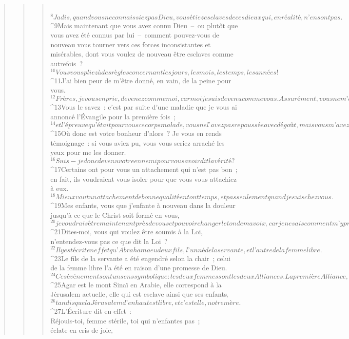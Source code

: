 \begin{verse}
\begin{verse}
\begin{verse}
         
${}^{8}Jadis, quand vous ne connaissiez pas Dieu, vous étiez esclaves de ces dieux qui, en réalité, n’en sont pas. 
${}^{9}Mais maintenant que vous avez connu Dieu – ou plutôt que vous avez été connus par lui – comment pouvez-vous de nouveau vous tourner vers ces forces inconsistantes et misérables, dont vous voulez de nouveau être esclaves comme autrefois ? 
${}^{10}Vous vous pliez à des règles concernant les jours, les mois, les temps, les années ! 
${}^{11}J’ai bien peur de m’être donné, en vain, de la peine pour vous.
${}^{12}Frères, je vous en prie, devenez comme moi, car moi je suis devenu comme vous. Assurément, vous ne m’avez fait aucun tort. 
${}^{13}Vous le savez : c’est par suite d’une maladie que je vous ai annoncé l’Évangile pour la première fois ; 
${}^{14}et l’épreuve qu’était pour vous ce corps malade, vous ne l’avez pas repoussée avec dégoût, mais vous m’avez accueilli comme un ange de Dieu, comme le Christ Jésus lui-même. 
${}^{15}Où donc est votre bonheur d’alors ? Je vous en rends témoignage : si vous aviez pu, vous vous seriez arraché les yeux pour me les donner. 
${}^{16}Suis-je donc devenu votre ennemi pour vous avoir dit la vérité ? 
${}^{17}Certains ont pour vous un attachement qui n’est pas bon ; en fait, ils voudraient vous isoler pour que vous vous attachiez à eux. 
${}^{18}Mieux vaut un attachement de bonne qualité en tout temps, et pas seulement quand je suis chez vous. 
${}^{19}Mes enfants, vous que j’enfante à nouveau dans la douleur jusqu’à ce que le Christ soit formé en vous, 
${}^{20}je voudrais être maintenant près de vous et pouvoir changer le ton de ma voix, car je ne sais comment m’y prendre avec vous.
${}^{21}Dites-moi, vous qui voulez être soumis à la Loi, n’entendez-vous pas ce que dit la Loi ? 
${}^{22}Il y est écrit en effet qu’Abraham a eu deux fils, l’un né de la servante, et l’autre de la femme libre. 
${}^{23}Le fils de la servante a été engendré selon la chair ; celui de la femme libre l’a été en raison d’une promesse de Dieu. 
${}^{24}Ces événements ont un sens symbolique : les deux femmes sont les deux Alliances. La première Alliance, celle du mont Sinaï, qui met au monde des enfants esclaves, c’est Agar, la servante. 
${}^{25}Agar est le mont Sinaï en Arabie, elle correspond à la Jérusalem actuelle, elle qui est esclave ainsi que ses enfants, 
${}^{26}tandis que la Jérusalem d’en haut est libre, et c’est elle, notre mère. 
${}^{27}L’Écriture dit en effet :
        \\Réjouis-toi, femme stérile, toi qui n’enfantes pas ;
        \\éclate en cris de joie,

\end{verse}
\end{verse}
\end{verse}
